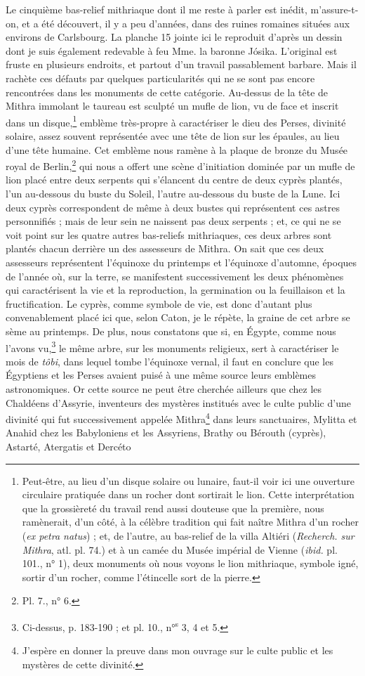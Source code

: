 \documentclass{article}
\begin{document}
Le cinquième bas-relief mithriaque dont il me reste à parler est inédit, m'assure-t-on, et a été découvert, il y a peu d'années, dans des ruines romaines situées aux environs de Carlsbourg. La planche 15 jointe ici le reproduit d'après un dessin dont je suis également redevable à feu Mme. la baronne Jósika. L'original est fruste en plusieurs endroits, et partout d'un travail passablement barbare. Mais il rachète ces défauts par quelques particularités qui ne se sont pas encore rencontrées dans les monuments de cette catégorie. Au-dessus de la tête de Mithra immolant le taureau est sculpté un mufle de lion, vu de face et inscrit dans un disque,\footnote{Peut-être, au lieu d'un disque solaire ou lunaire, faut-il voir ici une ouverture circulaire pratiquée dans un rocher dont sortirait le lion. Cette interprétation que la grossièreté du travail rend aussi douteuse que la première, nous ramènerait, d'un côté, à la célèbre tradition qui fait naître Mithra d'un rocher (\emph{ex petra natus}) ; et, de l'autre, au bas-relief de la villa Altiéri (\emph{Recherch. sur Mithra}, atl. pl. 74.) et à un camée du Musée impérial de Vienne (\emph{ibid.} pl. 101., n° 1), deux monuments où nous voyons le lion mithriaque, symbole igné, sortir d'un rocher, comme l'étincelle sort de la pierre.} emblème très-propre à caractériser le dieu des Perses, divinité solaire, assez souvent représentée avec une tête de lion sur les épaules, au lieu d'une tête humaine. Cet emblème nous ramène à la plaque de bronze du Musée royal de Berlin,\footnote{Pl. 7., n° 6.} qui nous a offert une scène d'initiation dominée par un mufle de lion placé entre deux serpents qui s'élancent du centre de deux cyprès plantés, l'un au-dessous du buste du Soleil, l'autre au-dessous du buste de la Lune. Ici deux cyprès correspondent de même à deux bustes qui représentent ces astres personnifiés ; mais de leur sein ne naissent pas deux serpents ; et, ce qui ne se voit point sur les quatre autres bas-reliefs mithriaques, ces deux arbres sont plantés chacun derrière un des assesseurs de Mithra. On sait que ces deux assesseurs représentent l'équinoxe du printemps et l'équinoxe d'automne, époques de l'année où, sur la terre, se manifestent successivement les deux phénomènes qui caractérisent la vie et la reproduction, la germination ou la feuillaison et la fructification. Le cyprès, comme symbole de vie, est donc d'autant plus convenablement placé ici que, selon Caton, je le répète, la graine de cet arbre se sème au printemps. De plus, nous constatons que si, en Égypte, comme nous l'avons vu,\footnote{Ci-dessus, p. 183-190 ; et pl. 10., n°\textsuperscript{s} 3, 4 et 5.} le même arbre, sur les monuments religieux, sert à caractériser le mois de \emph{tôbi}, dans lequel tombe l'équinoxe vernal, il faut en conclure que les Égyptiens et les Perses avaient puisé à une même source leurs emblèmes astronomiques. Or cette source ne peut être cherchée ailleurs que chez les Chaldéens d'Assyrie, inventeurs des mystères institués avec le culte public d'une divinité qui fut successivement appelée Mithra\footnote{J'espère en donner la preuve dans mon ouvrage sur le culte public et les mystères de cette divinité.} dans leurs sanctuaires, Mylitta et Anahid chez les Babyloniens et les Assyriens, Brathy ou Bérouth (cyprès), Astarté, Atergatis et Dercéto 
\end{document}
